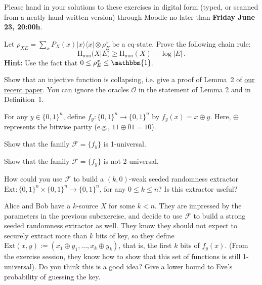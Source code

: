 \documentclass[a4paper,10pt,landscape,twocolumn]{scrartcl}
\newcommand{\ket}[1]{| #1 \rangle}
\newcommand{\bra}[1]{\langle #1 |}
\newcommand\deadline{Friday June 23, 20:00h}
\begin{document}
\newcommand{\Hmin}{\mathrm{H}_{\mathrm{min}}}

\homeworkproblems

{\sffamily\noindent
Please hand in your solutions to these exercises in digital form (typed, or scanned from a neatly hand-written version) through Moodle no later than \textbf{\deadline}.  %
}

\begin{exercise}
Let $\rho_{XE} = \sum_x P_X(x) \ket{x}\bra{x} \otimes \rho_E^x$ be a cq-state. Prove the following chain rule:
\[
\Hmin(X | E) \geq \Hmin(X) - \log |E| \, .
\]
\textbf{Hint: } Use the fact that $0 \leq \rho_E^x \leq \mathbbm{1}$.

\end{exercise}

\begin{exercise}
Show that an injective function is collapsing, i.e. give a proof of Lemma~2 of \href{http://homepages.cwi.nl/~schaffne/spool/sponges.pdf}{our recent paper}. You can ignore the oracles $\mathcal{O}$ in the statement of Lemma 2 and in Definition~1.
\end{exercise}

\begin{exercise}
	For any $y \in \{0,1\}^n$, define $f_y : \{0,1\}^n \to \{0,1\}^n$ by $f_y(x) = x \oplus y$. Here, $\oplus$ represents the bitwise parity (e.g., $11 \oplus 01 = 10$).
	\begin{subex}
		Show that the family $\mathscr{F} = \{f_y\}$ is 1-universal.
	\end{subex}
    \begin{subex}
        Show that the family $\mathscr{F} = \{f_y\}$ is not 2-universal.
    \end{subex}
    \begin{subex}
    	How could you use $\mathscr{F}$ to build a $(k,0)$-weak seeded randomness extractor $\text{Ext} : \{0,1\}^n \times \{0,1\}^n \to \{0,1\}^n$, for any $0 \leq k \leq n$? Is this extractor useful?
    \end{subex}
    \begin{subex}
    	Alice and Bob have a $k$-source $X$ for some $k < n$. They are impressed by the parameters in the previous subexercise, and decide to use $\mathscr{F}$ to build a strong seeded randomness extractor as well. They know they should not expect to securely extract more than $k$ bits of key, so they define $\text{Ext}(x,y) := (x_1 \oplus y_1, ..., x_k \oplus y_k)$, that is, the first $k$ bits of $f_y(x)$. (From the exercise session, they know how to show that this set of functions is still 1-universal). Do you think this is a good idea? Give a lower bound to Eve's probability of guessing the key.
    \end{subex}
\end{exercise}
\end{document}
